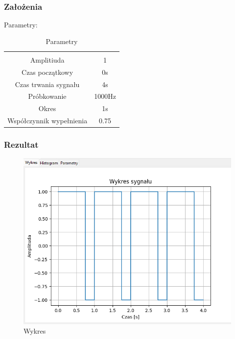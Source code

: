 \documentclass{article}
\begin{document}
\subsubsection{Założenia}
\noindent
Parametry:
\begin{table}[h!]
    \centering
    \vspace{0.2cm}
    \begin{tabular}{|c|c|}
        \hline\hline\\[-0.4cm]
        Amplitiuda & 1  \\
        \hline
        Czas początkowy & 0s  \\
        \hline
        Czas trwania sygnału & 4s  \\
        \hline
        Próbkowanie & 1000Hz \\
        \hline
        Okres & 1s\\
        \hline
        Współczynnik wypełnienia & 0.75\\
        \hline
    \end{tabular}
    \caption{Parametry}
    \label{prostokatsymetryczny}
\end{table}
\subsubsection{Rezultat}
\begin{figure}[h!]
    \centering
    \includegraphics[width=\textwidth]{img/prostokatsymetryczny/wykres.png}
    \caption{Wykres}
\end{figure}
\end{document}
